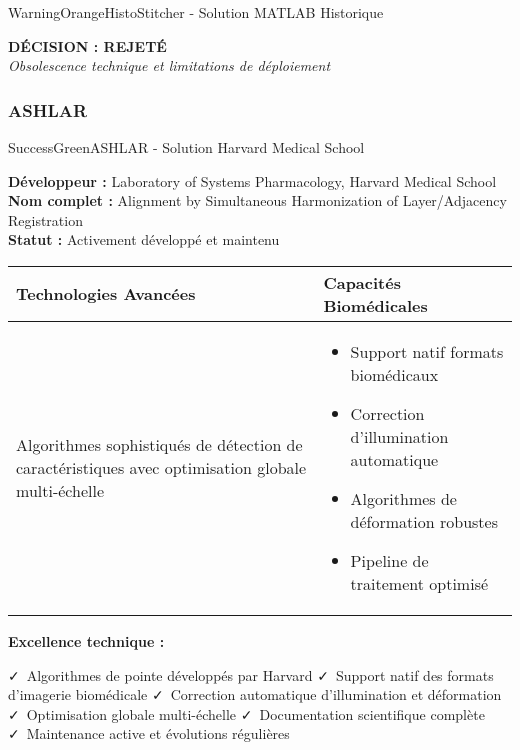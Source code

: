 \documentclass[12pt,a4paper]{report}
\newcommand{\pro}[1]{\textcolor{SuccessGreen}{\faCheck\ #1}}
\begin{document}
\begin{}
\begin{}
\begin{}
\begin{}
\begin{techbox}{WarningOrange}{HistoStitcher - Solution MATLAB Historique}
\begin{center}
\textbf{\textcolor{DangerRed}{DÉCISION : REJETÉ}}\\
\textit{Obsolescence technique et limitations de déploiement}
\end{center}

\end{techbox}

\subsubsection{ASHLAR}

\begin{techbox}{SuccessGreen}{ASHLAR - Solution Harvard Medical School}

\textbf{Développeur :} Laboratory of Systems Pharmacology, Harvard Medical School \\
\textbf{Nom complet :} Alignment by Simultaneous Harmonization of Layer/Adjacency Registration \\
\textbf{Statut :} Activement développé et maintenu

\vspace{0.5cm}

\begin{tabularx}{\textwidth}{|X|X|}
\hline
\rowcolor{LightGray}
\textbf{Technologies Avancées} & \textbf{Capacités Biomédicales} \\
\hline
Algorithmes sophistiqués de détection de caractéristiques avec optimisation globale multi-échelle &
\begin{itemize}[nosep]
\item Support natif formats biomédicaux
\item Correction d'illumination automatique
\item Algorithmes de déformation robustes
\item Pipeline de traitement optimisé
\end{itemize} \\
\hline
\end{tabularx}

\vspace{0.5cm}

\textbf{Excellence technique :}
\begin{itemize}[leftmargin=*]
    \pro{Algorithmes de pointe développés par Harvard}
    \pro{Support natif des formats d'imagerie biomédicale}
    \pro{Correction automatique d'illumination et déformation}
    \pro{Optimisation globale multi-échelle}
    \pro{Documentation scientifique complète}
    \pro{Maintenance active et évolutions régulières}
\end{itemize}


\end{techbox}
\end{}
\end{}
\end{}
\end{}
\end{document}
